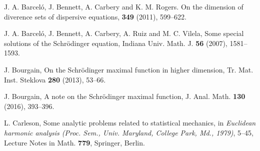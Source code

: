 \documentclass[biblatex]{pzorin-note}
\begin{document}
\begin{thebibliography}{15}



J. A. Barcel\'o, J. Bennett, A. Carbery and K. M. Rogers.
\newblock On the dimension of diverence sets of dispersive equations,
 {\bf349} (2011), 599--622.


 J. A. Barcel\'o, J. Bennett, A. Carbery, A. Ruiz and M. C. Vilela, Some special solutions of the Schr\"odinger equation, Indiana Univ. Math. J. {\bf 56} (2007), 1581--1593.












 J. Bourgain, On the Schr\"odinger maximal function in higher dimension, Tr. Mat. Inst. Steklova {\bf 280} (2013), 53--66.

J. Bourgain, A note on the Schr\"odinger maximal function, J. Anal. Math. {\bf130} (2016), 393--396.





L. Carleson, Some analytic problems related to statistical mechanics,
in {\it Euclidean harmonic analysis (Proc. Sem., Univ. Maryland, College Park, Md., 1979)}, 5--45,
Lecture Notes in Math. {\bf 779}, Springer, Berlin.





\end{thebibliography}
\end{document}
